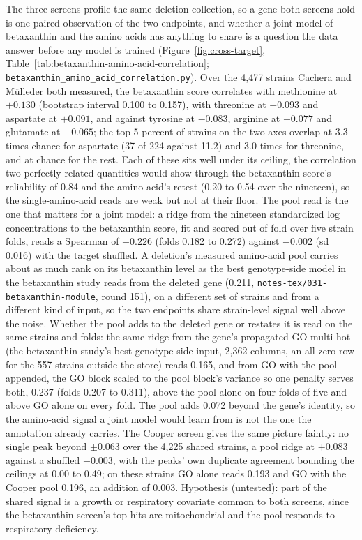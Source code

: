 The three screens profile the same deletion collection, so a gene both screens hold is
one paired observation of the two endpoints, and whether a joint model of betaxanthin
and the amino acids has anything to share is a question the data answer before any model
is trained (Figure~\ref{fig:cross-target}, Table~\ref{tab:betaxanthin-amino-acid-correlation};
\texttt{betaxanthin\_amino\_acid\_correlation.py}). Over the 4,477 strains Cachera and
M\"ulleder both measured, the betaxanthin score correlates with methionine at $+0.130$
(bootstrap interval 0.100 to 0.157), with threonine at $+0.093$ and aspartate at
$+0.091$, and against tyrosine at $-0.083$, arginine at $-0.077$ and glutamate at
$-0.065$; the top 5 percent of strains on the two axes overlap at 3.3 times chance for
aspartate (37 of 224 against 11.2) and 3.0 times for threonine, and at chance for the
rest. Each of these sits well under its ceiling, the correlation two perfectly related
quantities would show through the betaxanthin score's reliability of 0.84 and the amino
acid's retest (0.20 to 0.54 over the nineteen), so the single-amino-acid reads are weak
but not at their floor. The pool read is the one that matters for a joint model: a ridge
from the nineteen standardized log concentrations to the betaxanthin score, fit and
scored out of fold over five strain folds, reads a Spearman of $+0.226$ (folds 0.182 to
0.272) against $-0.002$ (sd 0.016) with the target shuffled. A deletion's measured
amino-acid pool carries about as much rank on its betaxanthin level as the best
genotype-side model in the betaxanthin study reads from the deleted gene (0.211,
\texttt{notes-tex/031-betaxanthin-module}, round 151), on a different set of strains and
from a different kind of input, so the two endpoints share strain-level signal well
above the noise. Whether the pool adds to the deleted gene or restates it is read on the
same strains and folds: the same ridge from the gene's propagated GO multi-hot (the
betaxanthin study's best genotype-side input, 2,362 columns, an all-zero row for the
557 strains outside the store) reads 0.165, and from GO with the pool appended, the GO
block scaled to the pool block's variance so one penalty serves both, 0.237 (folds 0.207
to 0.311), above the pool alone on four folds of five and above GO alone on every fold.
The pool adds 0.072 beyond the gene's identity, so the amino-acid signal a joint model
would learn from is not the one the annotation already carries. The Cooper screen gives
the same picture faintly: no single peak beyond $\pm 0.063$ over the 4,225 shared
strains, a pool ridge at $+0.083$ against a shuffled $-0.003$, with the peaks' own
duplicate agreement bounding the ceilings at 0.00 to 0.49; on these strains GO alone
reads 0.193 and GO with the Cooper pool 0.196, an addition of 0.003. Hypothesis
(untested): part of the shared signal is a growth or respiratory covariate common to
both screens, since the betaxanthin screen's top hits are mitochondrial and the pool
responds to respiratory deficiency.

